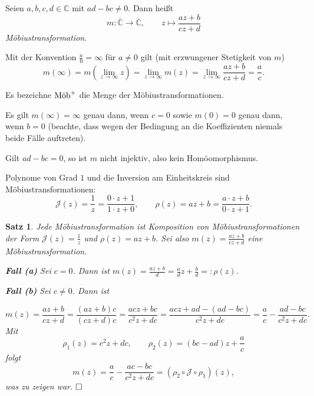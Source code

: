 \documentclass[11pt]{book}
\numberwithin{dummy}{section}
\newtheorem{theorem}{Satz}[section]
\theoremstyle{nonumberbreak}
\newenvironment{pr}[1][]{\ifthenelse{\equal{#1}{}}{\proof}{\proof[#1]}\rm}{\endproof}
\newenvironment{definbem}[1][]{\ifthenelse{\equal{#1}{}}{\definibem}{\definibem[#1]}\rm}{\enddefinibem}
\newcommand{\C}{\mathbb{C}}
\newcommand{\CC}{\overline{\mathbb{C}}}
\newcommand{\la}{\longrightarrow}
\newcommand{\mob}{\textup{Möb}^+}
\begin{document}
\begin{spacing}{1.4}
\begin{definbem}
\begin{compactenum}
\item Seien $a,b,c,d \in \C$ mit $ad-bc \neq 0$. Dann heißt 
$$m: \CC \la \CC, \qquad z \mapsto \frac{az+b}{cz+d}$$
\textit{Möbiustransformation}.
\item Mit der Konvention $\frac{a}{0} = \infty$ für $a \neq 0$ gilt (mit erzwungener Stetigkeit von $m$)
$$m(\infty) = m\left( \lim_{z \to \infty} z\right) =\lim_{z \to \infty} m(z)= \lim_{z \to \infty} \frac{az+b}{cz+d} = \frac{a}{c}.$$
\item Es bezeichne $\mob$ die Menge der Möbiustransformationen.
\item Es gilt $m(\infty) = \infty$ genau dann, wenn $c =0$ sowie $m(0)=0$ genau dann, wenn $b=0$ (beachte, dass wegen der Bedingung an die Koeffizienten niemals beide Fälle auftreten).
\item Gilt $ad-bc = 0$, so ist $m$ nicht injektiv, also kein Homöomorphismus.
\item Polynome von Grad $1$ und die Inversion am Einheitskreis sind Möbiustransformationen:
$$\mathcal{J}(z) = \frac{1}{z} = \frac{0 \cdot z +1}{1 \cdot z +0}, \qquad \rho(z)=az+b = \frac{a\cdot z+b}{0\cdot z+1}.$$

\end{compactenum}
\end{definbem}


\hypertarget{satzeinszweisieben}{}
\begin{theorem}       %
Jede Möbiustransformation ist Komposition von Möbiustransformationen der Form $\mathcal{J}(z)=\frac{1}{z}$ und $\rho(z) = az+b$.
\begin{pr}
Sei also $m(z)= \frac{az+b}{cz+d}$ eine Möbiustransformation.
\begin{compactenum}
\item[\textbf{Fall (a)}] Sei $c=0$. Dann ist $m(z)= \frac{az+b}{d} = \frac{a}{d} z + \frac{b}{d} =: \rho(z)$.
\item[\textbf{Fall (b)}] Sei $c \neq 0$. Dann ist 

$$m(z)= \frac{az+b}{cz+d} = \frac{(az+b)c}{(cz+d)c} = \frac{acz+bc}{c^2z+dc} = \frac{acz+ad-(ad-bc)}{c^2z+dc}=\frac{a}{c} - \frac{ad-bc}{c^2z+dc}.$$
Mit $$\rho_1(z)= c^2z+dc, \qquad \rho_2(z) = (bc-ad) z + \frac{a}{c}$$
folgt
$$m(z) = \frac{a}{c} - \frac{ac-bc}{c^2z+dc} = (\rho_2 \circ \mathcal{J} \circ \rho_1 )(z),$$
was zu zeigen war. $\hfill \Box$

\end{compactenum}
\end{pr}


\end{theorem}
\end{spacing}
\end{document}
